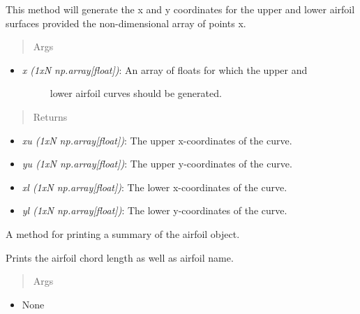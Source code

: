 \documentclass[letterpaper,10pt,english]{sphinxmanual}
\begin{document}
\begin{fulllineitems}
\begin{fulllineitems}
This method will generate the x and y coordinates for the upper and
lower airfoil surfaces provided the non-dimensional array of points x.
\begin{quote}\begin{description}
\item[{Args}] \leavevmode
\end{description}\end{quote}
\begin{itemize}
\item {} \begin{description}
\item[{\emph{x (1xN np.array{[}float{]})}: An array of floats for which the upper and}] \leavevmode
lower airfoil curves should be generated.

\end{description}

\end{itemize}
\begin{quote}\begin{description}
\item[{Returns}] \leavevmode
\end{description}\end{quote}
\begin{itemize}
\item {} 
\emph{xu (1xN np.array{[}float{]})}: The upper x-coordinates of the curve.

\item {} 
\emph{yu (1xN np.array{[}float{]})}: The upper y-coordinates of the curve.

\item {} 
\emph{xl (1xN np.array{[}float{]})}: The lower x-coordinates of the curve.

\item {} 
\emph{yl (1xN np.array{[}float{]})}: The lower y-coordinates of the curve.

\end{itemize}

\end{fulllineitems}


\begin{fulllineitems}
\label{aerodynamics:AeroComBAT.Aerodynamics.Airfoil.printSummary}
A method for printing a summary of the airfoil object.

Prints the airfoil chord length as well as airfoil name.
\begin{quote}\begin{description}
\item[{Args}] \leavevmode
\end{description}\end{quote}
\begin{itemize}
\item {} 
None


\end{itemize}
\end{fulllineitems}
\end{fulllineitems}
\end{document}
